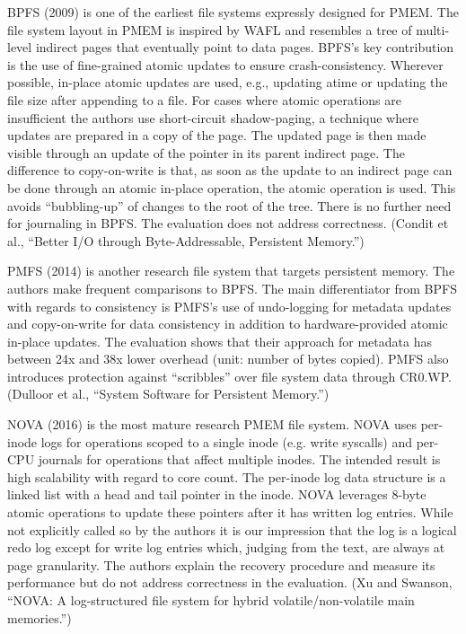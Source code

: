 \documentclass[12pt,a4paper,twoside,draft]{book}
\begin{document}
BPFS (2009) is one of the earliest file systems expressly designed for PMEM.
The file system layout in PMEM is inspired by WAFL and resembles a tree of multi-level indirect pages that eventually point to data pages.
BPFS’s key contribution is the use of fine-grained atomic updates to ensure crash-consistency.
Wherever possible, in-place atomic updates are used, e.g., updating atime or updating the file size after appending to a file.
For cases where atomic operations are insufficient the authors use short-circuit shadow-paging, a technique where updates are prepared in a copy of the page.
The updated page is then made visible through an update of the pointer in its parent indirect page.
The difference to copy-on-write is that, as soon as the update to an indirect page can be done through an atomic in-place operation, the atomic operation is used.
This avoids “bubbling-up” of changes to the root of the tree.
There is no further need for journaling in BPFS.
The evaluation does not address correctness. (Condit et al., “Better I/O through Byte-Addressable, Persistent Memory.”)

PMFS (2014) is another research file system that targets persistent memory.
The authors make frequent comparisons to BPFS.
The main differentiator from BPFS with regards to consistency is PMFS’s use of undo-logging for metadata updates and copy-on-write for data consistency in addition to hardware-provided atomic in-place updates.
The evaluation shows that their approach for metadata has between 24x and 38x lower overhead (unit: number of bytes copied).
PMFS also introduces protection against “scribbles” over file system data through CR0.WP. (Dulloor et al., “System Software for Persistent Memory.”)

NOVA (2016) is the most mature research PMEM file system.
NOVA uses per-inode logs for operations scoped to a single inode (e.g. write syscalls) and per-CPU journals for operations that affect multiple inodes.
The intended result is high scalability with regard to core count.
The per-inode log data structure is a linked list with a head and tail pointer in the inode.
NOVA leverages 8-byte atomic operations to update these pointers after it has written log entries.
While not explicitly called so by the authors it is our impression that the log is a logical redo log except for write log entries which, judging from the text, are always at page granularity.
The authors explain the recovery procedure and measure its performance but do not address correctness in the evaluation.
(Xu and Swanson, “NOVA: A log-structured file system for hybrid volatile/non-volatile main memories.”)
\end{document}
